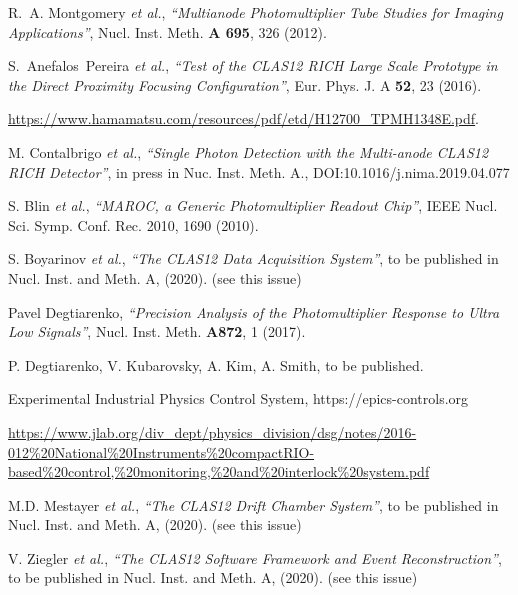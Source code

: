 \documentclass[5p,times,twocolumn]{elsarticle}
\begin{document}
\begin{thebibliography}{00}
R.~A. Montgomery {\it et al.}, {\it ``Multianode Photomultiplier Tube Studies for Imaging Applications''},
Nucl. Inst. Meth. {\bf A 695}, 326 (2012).

S.~Anefalos~Pereira {\it et al.}, {\it ``Test of the CLAS12 RICH Large Scale Prototype in the Direct Proximity Focusing Configuration''},
Eur. Phys. J. A {\bf 52}, 23 (2016).

 \url{https://www.hamamatsu.com/resources/pdf/etd/H12700\_TPMH1348E.pdf}.

M. Contalbrigo {\it et al.}, {\it ``Single Photon Detection with the Multi-anode CLAS12 RICH Detector''}, 
in press in Nuc. Inst. Meth. A.,
DOI:10.1016/j.nima.2019.04.077

 S. Blin {\it et al.}, {\it ``MAROC, a Generic Photomultiplier Readout Chip''},
IEEE Nucl. Sci. Symp. Conf. Rec. 2010, 1690 (2010).

S. Boyarinov {\it et al.}, {\it ``The CLAS12 Data Acquisition System''}, 
to be published in Nucl. Inst. and Meth. A, (2020). (see this issue)

Pavel Degtiarenko, {\it ``Precision Analysis of the Photomultiplier Response to Ultra Low Signals''}, 
Nucl. Inst. Meth. {\bf A872}, 1 (2017).

 P. Degtiarenko, V. Kubarovsky, A. Kim, A. Smith, to be published.

 Experimental Industrial Physics Control System, https://epics-controls.org

 \url{https://www.jlab.org/div_dept/physics_division/dsg/notes/2016-012%20National%20Instruments%20compactRIO-based%20control,%20monitoring,%20and%20interlock%20system.pdf}

M.D. Mestayer {\it et al.}, {\it ``The CLAS12 Drift Chamber System''}, to be published in Nucl. Inst.
and Meth. A, (2020). (see this issue)

V. Ziegler {\it et al.}, {\it ``The CLAS12 Software Framework and Event Reconstruction''}, to be published in Nucl. Inst.
and Meth. A, (2020). (see this issue)
  
\end{thebibliography}
\end{document}
